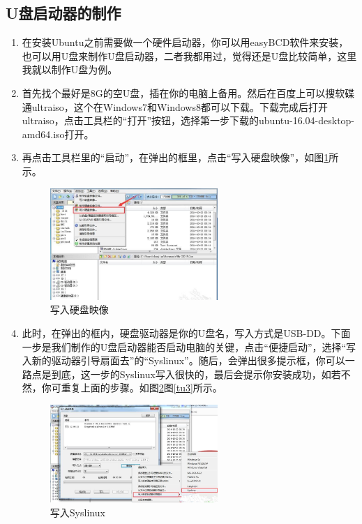 \documentclass{article}
\begin{document}
\subsection{U盘启动器的制作}
\begin{enumerate}
\item 在安装Ubuntu之前需要做一个硬件启动器，你可以用easyBCD软件来安装，也可以用U盘来制作U盘启动器，二者我都用过，觉得还是U盘比较简单，这里我就以制作U盘为例。

\item 首先找个最好是8G的空U盘，插在你的电脑上备用。然后在百度上可以搜软碟通ultraiso，这个在Windows7和Windows8都可以下载。下载完成后打开ultraiso，点击工具栏的“打开”按钮，选择第一步下载的ubuntu-16.04-desktop-amd64.iso打开。

\item 再点击工具栏里的“启动”，在弹出的框里，点击“写入硬盘映像”，如图\ref{tu1}所示。
\begin{figure}[!htb] %
\centering
\includegraphics[width=0.6\textwidth]{tu1.jpeg}
\caption{\small 写入硬盘映像}
\label{tu1}
\end{figure}  

\item 此时，在弹出的框内，硬盘驱动器是你的U盘名，写入方式是USB-DD。下面一步是我们制作的U盘启动器能否启动电脑的关键，点击“便捷启动”，选择“写入新的驱动器引导扇面去”的“Syslinux”。随后，会弹出很多提示框，你可以一路点是到底，这一步的Syslinux写入很快的，最后会提示你安装成功，如若不然，你可重复上面的步骤。如图\ref{tu2}图\ref{tu3}所示。
\begin{figure}[!htb] %
\centering
\includegraphics[width=0.6\textwidth]{tu2.jpeg}
\caption{\small 写入Syslinux}
\label{tu2}
\end{figure}  


\end{enumerate}
\end{document}
